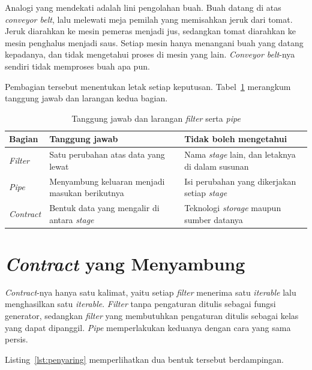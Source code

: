 Analogi yang mendekati adalah lini pengolahan buah. Buah datang di atas
\textit{conveyor belt}, lalu melewati meja pemilah yang memisahkan jeruk dari
tomat. Jeruk diarahkan ke mesin pemeras menjadi jus, sedangkan tomat diarahkan
ke mesin penghalus menjadi saus. Setiap mesin hanya menangani buah yang datang
kepadanya, dan tidak mengetahui proses di mesin yang lain.
\textit{Conveyor belt}-nya sendiri tidak memproses buah apa pun.

Pembagian tersebut menentukan letak setiap keputusan.
Tabel~\ref{tab:penyaring-pipa} merangkum tanggung jawab dan larangan kedua
bagian.

\begin{table}[htbp]
  \centering
  \caption{Tanggung jawab dan larangan \textit{filter} serta \textit{pipe}}
  \label{tab:penyaring-pipa}
  \begin{tabularx}{\textwidth}{|l|X|X|}
    \hline
    \textbf{Bagian} & \textbf{Tanggung jawab} & \textbf{Tidak boleh mengetahui} \\
    \hline
    \textit{Filter} & Satu perubahan atas data yang lewat & Nama \textit{stage} lain, dan letaknya di dalam susunan \\
    \hline
    \textit{Pipe} & Menyambung keluaran menjadi masukan berikutnya & Isi perubahan yang dikerjakan setiap \textit{stage} \\
    \hline
    \textit{Contract} & Bentuk data yang mengalir di antara \textit{stage} & Teknologi \textit{storage} maupun sumber datanya \\
    \hline
  \end{tabularx}
\end{table}

\section{\textit{Contract} yang Menyambung}

\textit{Contract}-nya hanya satu kalimat, yaitu setiap
\textit{filter}
menerima satu \textit{iterable} lalu menghasilkan satu \textit{iterable}.
\textit{Filter} tanpa pengaturan ditulis sebagai fungsi generator, sedangkan
\textit{filter} yang membutuhkan pengaturan ditulis sebagai kelas yang dapat
dipanggil. \textit{Pipe} memperlakukan keduanya dengan cara yang sama persis.

Listing~\ref{lst:penyaring} memperlihatkan dua bentuk tersebut berdampingan.

